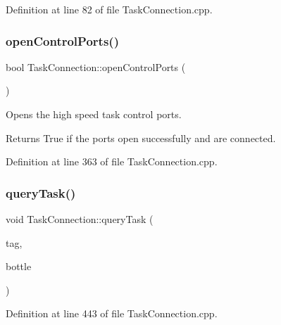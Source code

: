 Definition at line 82 of file Task\+Connection.\+cpp.

\hypertarget{classocra__recipes_1_1TaskConnection_ab7feddafb3948aaf67bf00b227591694}{}\label{classocra__recipes_1_1TaskConnection_ab7feddafb3948aaf67bf00b227591694} 
\subsubsection{\texorpdfstring{open\+Control\+Ports()}{openControlPorts()}}
{\footnotesize\ttfamily bool Task\+Connection\+::open\+Control\+Ports (\begin{DoxyParamCaption}{ }\end{DoxyParamCaption})}

Opens the high speed task control ports.

\begin{DoxyReturn}{Returns}
True if the ports open successfully and are connected. 
\end{DoxyReturn}


Definition at line 363 of file Task\+Connection.\+cpp.

\hypertarget{classocra__recipes_1_1TaskConnection_ae4450b3d9912471527716d7fe11e279e}{}\label{classocra__recipes_1_1TaskConnection_ae4450b3d9912471527716d7fe11e279e} 
\subsubsection{\texorpdfstring{query\+Task()}{queryTask()}}
{\footnotesize\ttfamily void Task\+Connection\+::query\+Task (\begin{DoxyParamCaption}\item[{\hyperlink{namespaceocra_ae51761f3980546f5ee4cbc6ebe4216dd}{ocra\+::\+T\+A\+S\+K\+\_\+\+M\+E\+S\+S\+A\+GE}}]{tag,  }\item[{yarp\+::os\+::\+Bottle \&}]{bottle }\end{DoxyParamCaption})}



Definition at line 443 of file Task\+Connection.\+cpp.

